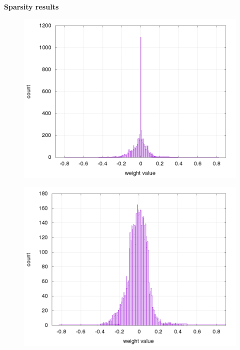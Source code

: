 \documentclass[xcolor=dvipsnames]{beamer}
\begin{document}
\begin{frame}{\bf Sparsity results}
\begin{figure}[!htb]
\centering
\begin{minipage}{.5\textwidth}
  \centering
  \includegraphics[scale=0.15]{../../results/rl_arcade/hnn_trained_0/supervised/layer_1_histogram.png}
  \label{img:AE+FNN sparse weights histogram}
\end{minipage}%
\begin{minipage}{.5\textwidth}
  \centering
  \includegraphics[scale=0.15]{../../results/rl_arcade/hnn_trained_5/supervised/layer_1_histogram.png}
  \label{img:AE+FNN no sparse weights histogram}
\end{minipage}
\end{figure}

\end{frame}
\end{document}
